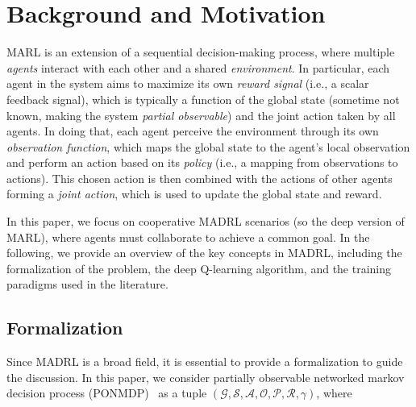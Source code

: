 \documentclass[sigconf]{acmart}
\begin{document}
\section{Background and Motivation}\label{sec:background}
MARL is an extension of a sequential decision-making process, 
where multiple \emph{agents} interact with each other and a shared \emph{environment}.
In particular, each agent in the system aims to maximize its own \emph{reward signal} (i.e., a scalar feedback signal),
which is typically a function of the global state (sometime not known, making the system \emph{partial observable}) and the joint action taken by all agents.
%
In doing that, each agent perceive the environment through its own \emph{observation function},
which maps the global state to the agent's local observation and perform an action based on its \emph{policy} (i.e., a mapping from observations to actions).
%
This chosen action is then combined with the actions of other agents forming a \emph{joint action},
which is used to update the global state and reward.
 
In this paper, we focus on cooperative MADRL scenarios (so the deep version of MARL), 
where agents must collaborate to achieve a common goal.
In the following, we provide an overview of the key concepts in MADRL, 
including the formalization of the problem, the deep Q-learning algorithm, and the training paradigms used in the literature.
\subsection{Formalization}
Since MADRL is a broad field, it is essential to provide a formalization to guide the discussion.
In this paper, we consider partially observable networked markov decision process (PONMDP)~\cite{DBLP:journals/tac/AdlakhaLG12} as a tuple $(\mathcal{G}, \mathcal{S}, \mathcal{A}, \mathcal{O}, \mathcal{P}, \mathcal{R}, \gamma)$, where
\end{document}
